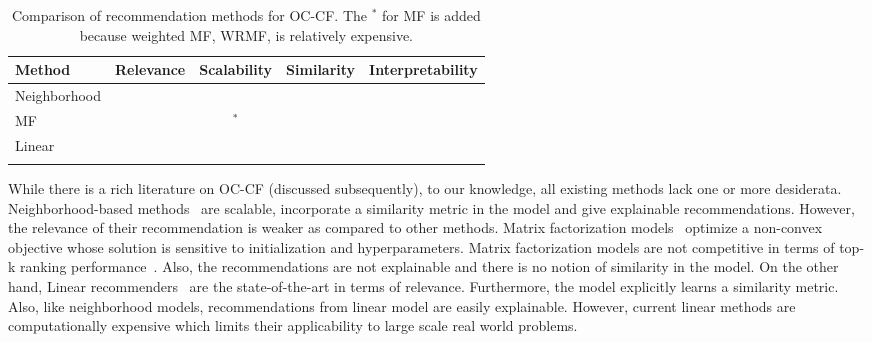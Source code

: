 \begin{table*}[!t]
	\centering

		\begin{tabular}{llccc}
		\toprule
		\toprule
		\textbf{Method} & \textbf{Relevance} & \textbf{Scalability} & \textbf{Similarity} & \textbf{Interpretability} \\
		\toprule
		Neighborhood & \cross & \tick & \tick & \tick \\
		MF & \cross & \tick$^*$  & \cross & \cross \\
		Linear & \tick & \cross & \tick & \tick \\
		\LinearLow & \tick & \tick & \tick & \tick \\
		\bottomrule
		\end{tabular}
	\caption{Comparison of recommendation methods for OC-CF. The $^*$ for MF is added because weighted MF, WRMF, is relatively expensive.}
	\label{tbl:comparison}
\end{table*}

While there is a rich literature on OC-CF (discussed subsequently),
to our knowledge, all existing methods lack one
or more desiderata.
Neighborhood-based methods~\citep{Sarwar:2001, Linden:2003} are scalable, incorporate a similarity metric in the model and give explainable recommendations.
However, the relevance of their recommendation is weaker as compared to other methods.
Matrix factorization models~\citep{Hu:2008} optimize a non-convex objective whose solution is sensitive to initialization and hyperparameters. Matrix factorization models are  %
not competitive in terms of top-k ranking performance~\cite{Ning:2011, Sedhain:2016}. Also, the recommendations are not explainable and there is no notion of similarity in the model. On the other hand, Linear recommenders~\cite{Ning:2011, Sedhain:2016} are the state-of-the-art in terms of relevance. Furthermore, the model explicitly learns a similarity metric. Also, like neighborhood models, recommendations from linear model are easily explainable. However, current linear methods are computationally expensive which limits their applicability to large scale real world problems.


